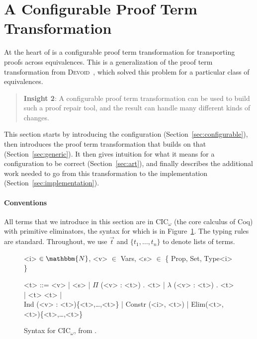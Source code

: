 \section{A Configurable Proof Term Transformation}
\label{sec:key2}

At the heart of \toolname is a configurable proof term transformation for transporting
proofs across equivalences. This is a generalization of the proof term transformation from 
\textsc{Devoid}~\cite{Ringer2019}, which solved this problem for a particular class of equivalences.

\begin{quote}
\textbf{Insight 2}:
A configurable proof term transformation can be used to build such a proof repair tool,
and the result can handle many different kinds of changes.
\end{quote}

This section starts by introducing the configuration (Section~\ref{sec:configurable}),
then introduces the proof term transformation that builds on that (Section~\ref{sec:generic}).
It then gives intuition for what it means for a configuration to be correct (Section~\ref{sec:art}),
and finally describes the additional work needed to go from this transformation to the implementation (Section~\ref{sec:implementation}). 

\paragraph{Conventions}
All terms that we introduce in this section are in CIC$_{\omega}$ (the core calculus of Coq) with primitive eliminators,
the syntax for which is in Figure~\ref{fig:syntax}.
The typing rules are standard.
Throughout, we use $\vec{t}$ and $\{t_1, \ldots, t_n\}$ to denote lists of terms.

\begin{figure}
\small
\begin{grammar}
<i> $\in \mathbbm{N}$, <v> $\in$ Vars, <s> $\in$ \{ Prop, Set, Type<i> \}

<t> ::= <v> | <s> | $\Pi$ (<v> : <t>) . <t> | $\lambda$ (<v> : <t>) . <t> | <t> <t> | \\ 
Ind (<v> : <t>)\{<t>,\ldots,<t>\} | Constr (<i>, <t>) | Elim(<t>, <t>)\{<t>,\ldots,<t>\}
\end{grammar}
\vspace{-0.3cm}
\caption{Syntax for CIC$_\omega$, from \citet{Timany2015FirstST}.}
\label{fig:syntax}
\end{figure}

